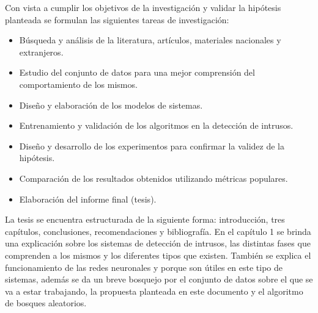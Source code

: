 
Con vista a cumplir los objetivos de la investigación y validar la hipótesis planteada se formulan las siguientes tareas de investigación:

\begin{itemize}
    \item Búsqueda y análisis de la literatura, artículos, materiales nacionales y extranjeros.
    \item Estudio del conjunto de datos para una mejor comprensión del comportamiento de los mismos.
    \item Diseño y elaboración de los modelos de sistemas.
    \item Entrenamiento y validación de los algoritmos en la detección de intrusos.
    \item Diseño y desarrollo de los experimentos para confirmar la validez de la hipótesis.
    \item Comparación de los resultados obtenidos utilizando métricas populares.
    \item Elaboración del informe final (tesis).
\end{itemize}

La tesis se encuentra estructurada de la siguiente forma: introducción, tres capítulos, conclusiones, recomendaciones y bibliografía. 
En el capítulo 1 se brinda una explicación sobre los sistemas de detección de intrusos, las distintas fases que comprenden a los mismos y los diferentes tipos que existen. También se explica el funcionamiento de las redes neuronales y porque son útiles en este tipo de sistemas, además se da un breve bosquejo por el conjunto de datos sobre el que se va a estar trabajando, la propuesta planteada en este documento y el algoritmo de bosques aleatorios.

